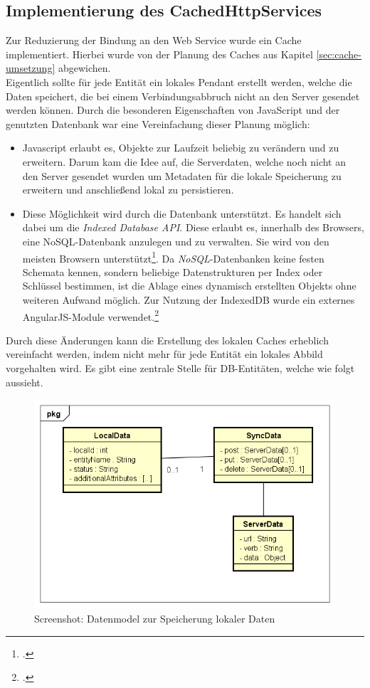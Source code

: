{\subsection{Implementierung des CachedHttpServices}
\label{ssec:Implementierung-cachedHttpService}
Zur Reduzierung der Bindung an den Web Service wurde ein Cache implementiert. Hierbei wurde von der Planung des Caches aus Kapitel \ref{sec:cache-umsetzung} abgewichen. \\
Eigentlich sollte für jede Entität ein lokales Pendant erstellt werden, welche die Daten speichert, die bei einem Verbindungsabbruch nicht an den Server gesendet werden können. Durch die besonderen Eigenschaften von JavaScript und der genutzten Datenbank war eine Vereinfachung dieser Planung möglich:
\begin{itemize}
\item Javascript erlaubt es, Objekte zur Laufzeit beliebig zu verändern und zu erweitern. Darum kam die Idee auf, die Serverdaten, welche noch nicht an den Server gesendet wurden um Metadaten für die lokale Speicherung zu erweitern und anschließend lokal zu persistieren.
\item Diese Möglichkeit wird durch die Datenbank unterstützt. Es handelt sich dabei um die \textit{Indexed Database API}. Diese erlaubt es, innerhalb des Browsers, eine \ac{NoSQL}-Datenbank anzulegen und zu verwalten. Sie wird von den meisten Browsern unterstützt\footcite{online:caniuse:indexedDB}. Da \textit{NoSQL}-Datenbanken keine festen Schemata kennen, sondern beliebige Datenstrukturen per Index oder Schlüssel bestimmen, ist die Ablage eines dynamisch erstellten Objekts ohne weiteren Aufwand möglich. Zur Nutzung der IndexedDB wurde ein externes AngularJS-Module verwendet.\footcite{online:AngularJs:indexedDB}
\end{itemize}  
Durch diese Änderungen kann die Erstellung des lokalen Caches erheblich vereinfacht werden, indem nicht mehr für jede Entität ein lokales Abbild vorgehalten wird. Es gibt eine zentrale Stelle für DB-Entitäten, welche wie folgt aussieht.

\begin{figure}[h]
\centering
\includegraphics[width=0.8\linewidth]{content/images/DataModel-Cache-SPA}
\caption{Screenshot: Datenmodel zur Speicherung lokaler Daten}
\label{pic:DataModel-Cache-SPA}
\end{figure}

}
